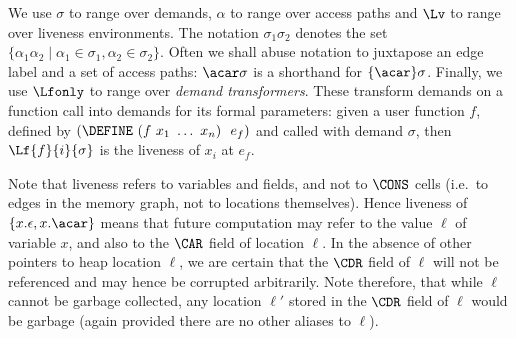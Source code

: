 We use $\sigma$ to range over demands, $\alpha$ to range over access paths
and $\Lv$ to range over liveness environments. The notation
$\sigma_1\sigma_2$ denotes the set $\lbrace \alpha_1\alpha_2 \mid
\alpha_1 \in \sigma_1, \alpha_2 \in \sigma_2\rbrace$. Often we shall
abuse notation to juxtapose an edge label and a set of access paths:
$\acar\sigma$ is a shorthand for $\lbrace\acar\rbrace\sigma$.
Finally, we use $\Lfonly$ to range over {\em demand transformers}.
These transform demands on a function call
into demands for its formal parameters:
given a user function $f$, defined by
$(\DEFINE\ (f\ x_1\ \ldots\ x_n)\ \ e_f)$ and called with demand $\sigma$,
then $\Lf{f}{i}{\sigma}$ is the liveness of $x_i$ at $e_f$.

Note that liveness refers to variables and fields, and not to $\CONS$ cells
(i.e.\ to edges in the memory graph, not to locations themselves).
Hence liveness of $\{x.\epsilon,x.\acar\}$ means that future computation
may refer to the value $\ell$ of variable $x$, and also to the $\CAR$ field
of location $\ell$.
In the absence of other pointers to heap location $\ell$, we are
certain that the $\CDR$ field of $\ell$ will not be referenced
and may hence be corrupted arbitrarily.
Note therefore, that while  $\ell$ cannot be garbage collected, any
location $\ell'$ stored in the $\CDR$ field of $\ell$ would be garbage
(again provided there are no other aliases to  $\ell$).




